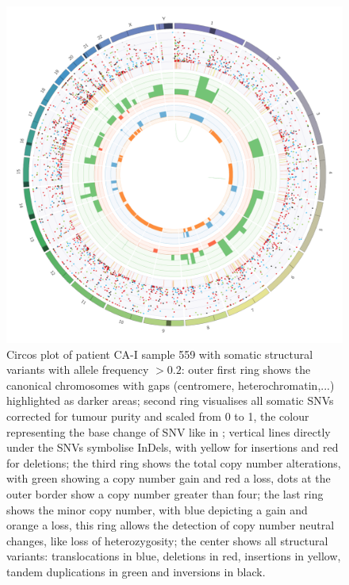 \begin{figure}[ht]
\centering
\includegraphics[width=.99\linewidth]{Figures/CASCADE/CA51/CA51-559.circos.png}
\caption[Circos plot of patient CA-I sample 559]{Circos plot of patient CA-I sample 559 with somatic structural variants with allele frequency $> 0.2$: outer first ring shows the canonical chromosomes with gaps (centromere, heterochromatin,...) highlighted as darker areas; second ring visualises all somatic SNVs corrected for tumour purity and scaled from 0 to 1, the colour representing the base change of SNV like in \protect\textcite{Alexandrov2013}; vertical lines directly under the SNVs symbolise InDels, with yellow for insertions and red for deletions; the third ring shows the total copy number alterations, with green showing a copy number gain and red a loss, dots at the outer border show a copy number greater than four; the last ring shows the minor copy number, with blue depicting a gain and orange a loss, this ring allows the detection of copy number neutral changes, like loss of heterozygosity; the center shows all structural variants: translocations in blue, deletions in red, insertions in yellow, tandem duplications in green and inversions in black.} \label{fig:ca51.559circos}
\end{figure}

